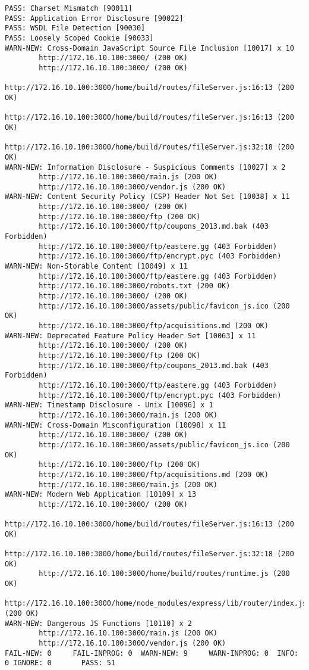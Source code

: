 \begin{lstlisting}[caption=OWASP ZAP baseline scan, captionpos=b, frame=single, label={owasp-zap-cli-full-output}]
PASS: Charset Mismatch [90011]
PASS: Application Error Disclosure [90022]
PASS: WSDL File Detection [90030]
PASS: Loosely Scoped Cookie [90033]
WARN-NEW: Cross-Domain JavaScript Source File Inclusion [10017] x 10
        http://172.16.10.100:3000/ (200 OK)
        http://172.16.10.100:3000/ (200 OK)
        http://172.16.10.100:3000/home/build/routes/fileServer.js:16:13 (200 OK)
        http://172.16.10.100:3000/home/build/routes/fileServer.js:16:13 (200 OK)
        http://172.16.10.100:3000/home/build/routes/fileServer.js:32:18 (200 OK)
WARN-NEW: Information Disclosure - Suspicious Comments [10027] x 2
        http://172.16.10.100:3000/main.js (200 OK)
        http://172.16.10.100:3000/vendor.js (200 OK)
WARN-NEW: Content Security Policy (CSP) Header Not Set [10038] x 11
        http://172.16.10.100:3000/ (200 OK)
        http://172.16.10.100:3000/ftp (200 OK)
        http://172.16.10.100:3000/ftp/coupons_2013.md.bak (403 Forbidden)
        http://172.16.10.100:3000/ftp/eastere.gg (403 Forbidden)
        http://172.16.10.100:3000/ftp/encrypt.pyc (403 Forbidden)
WARN-NEW: Non-Storable Content [10049] x 11
        http://172.16.10.100:3000/ftp/eastere.gg (403 Forbidden)
        http://172.16.10.100:3000/robots.txt (200 OK)
        http://172.16.10.100:3000/ (200 OK)
        http://172.16.10.100:3000/assets/public/favicon_js.ico (200 OK)
        http://172.16.10.100:3000/ftp/acquisitions.md (200 OK)
WARN-NEW: Deprecated Feature Policy Header Set [10063] x 11
        http://172.16.10.100:3000/ (200 OK)
        http://172.16.10.100:3000/ftp (200 OK)
        http://172.16.10.100:3000/ftp/coupons_2013.md.bak (403 Forbidden)
        http://172.16.10.100:3000/ftp/eastere.gg (403 Forbidden)
        http://172.16.10.100:3000/ftp/encrypt.pyc (403 Forbidden)
WARN-NEW: Timestamp Disclosure - Unix [10096] x 1
        http://172.16.10.100:3000/main.js (200 OK)
WARN-NEW: Cross-Domain Misconfiguration [10098] x 11
        http://172.16.10.100:3000/ (200 OK)
        http://172.16.10.100:3000/assets/public/favicon_js.ico (200 OK)
        http://172.16.10.100:3000/ftp (200 OK)
        http://172.16.10.100:3000/ftp/acquisitions.md (200 OK)
        http://172.16.10.100:3000/main.js (200 OK)
WARN-NEW: Modern Web Application [10109] x 13
        http://172.16.10.100:3000/ (200 OK)
        http://172.16.10.100:3000/home/build/routes/fileServer.js:16:13 (200 OK)
        http://172.16.10.100:3000/home/build/routes/fileServer.js:32:18 (200 OK)
        http://172.16.10.100:3000/home/build/routes/runtime.js (200 OK)
        http://172.16.10.100:3000/home/node_modules/express/lib/router/index.js:280:10 (200 OK)
WARN-NEW: Dangerous JS Functions [10110] x 2
        http://172.16.10.100:3000/main.js (200 OK)
        http://172.16.10.100:3000/vendor.js (200 OK)
FAIL-NEW: 0     FAIL-INPROG: 0  WARN-NEW: 9     WARN-INPROG: 0  INFO: 0 IGNORE: 0       PASS: 51
\end{lstlisting}
